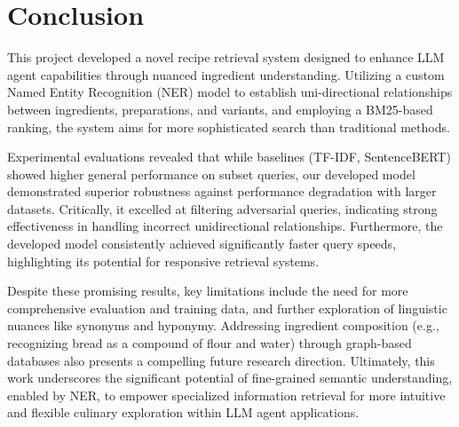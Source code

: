 \documentclass[11pt]{article}
\begin{document}
\section{Conclusion}
This project developed a novel recipe retrieval system designed to enhance LLM
agent capabilities through nuanced ingredient understanding.
Utilizing a custom Named Entity Recognition (NER) model to establish
uni-directional relationships between ingredients, preparations, and variants,
and employing a BM25-based ranking, the system aims for more sophisticated
search than traditional methods.

Experimental evaluations revealed that while baselines (TF-IDF, SentenceBERT)
showed higher general performance on subset queries, our developed model
demonstrated superior robustness against performance degradation with larger
datasets.
Critically, it excelled at filtering adversarial queries, indicating strong
effectiveness in handling incorrect unidirectional relationships.
Furthermore, the developed model consistently achieved significantly faster
query speeds, highlighting its potential for responsive retrieval systems.

Despite these promising results, key limitations include the need for more
comprehensive evaluation and training data, and further exploration of
linguistic nuances like synonyms and hyponymy.
Addressing ingredient composition (e.g., recognizing bread as a compound of
flour and water) through graph-based databases also presents a compelling future
research direction.
Ultimately, this work underscores the significant potential of fine-grained
semantic understanding, enabled by NER, to empower specialized information
retrieval for more intuitive and flexible culinary exploration within LLM agent
applications.



\appendix
\end{document}
